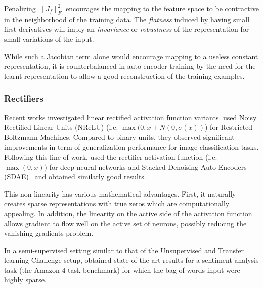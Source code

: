 Penalizing $\|J_f\|_F^2$ encourages the mapping to the feature space to be
contractive in the neighborhood of the training data.   The {\em flatness}
induced by having small first derivatives will imply an {\em invariance}
or {\em robustness} of the representation for small variations of the input.

While such a Jacobian term alone would encourage mapping to a useless constant
representation, it is counterbalanced in auto-encoder training by the need for
the learnt representation to allow a good reconstruction of the training
examples.


\subsubsection{Rectifiers}



Recent works investigated linear rectified activation function variants.
\citet{Nair+Hinton-2010} used Noisy Rectified Linear Units (NReLU) (i.e.
$\max(0,x+N(0,\sigma(x))$) for Restricted Boltzmann Machines.  Compared to
binary units, they observed significant improvements in term of generalization
performance for image classification tasks. Following this line of work,
\citet{Glorot+al-AI-2011} used the rectifier activation function (i.e.
$\max(0,x)$) for deep neural networks and Stacked Denoising Auto-Encoders
(SDAE)~\citep{VincentPLarochelleH2008,Vincent-JMLR-2010} and obtained 
similarly good results.


This non-linearity has various mathematical advantages. First, it naturally 
creates sparse representations with true zeros which are computationally 
appealing. In addition, the linearity on the active side of the activation function
allows gradient to flow well on the active set of neurons, possibly reducing the 
vanishing gradients problem.

In a semi-supervised setting similar to that of the Unsupervised and
Transfer learning Challenge setup, \citet{Glorot+al-AI-2011} obtained 
state-of-the-art results for a sentiment analysis task (the Amazon 4-task benchmark) 
for which the  bag-of-words input were highly sparse.

